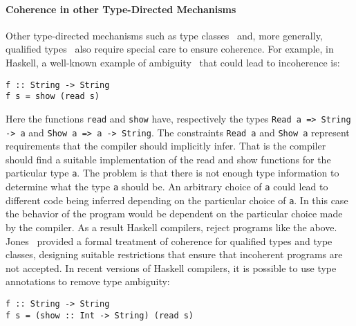 \begin{comment}
As an alternative to syntactic subtyping described in this paper,
Frisch~\textit{et al.}~\cite{frisch2008semantic} studied semantic subtyping. Semantic
subtyping attempts to increase the expressive power of the 

seems to have important advantages over syntactic subtyping. One
worthy avenue for future work is to study languages with intersection types
and merge operator in a semantic subtyping setting.
\end{comment}

\paragraph{Coherence in other Type-Directed Mechanisms} Other
type-directed mechanisms such as type classes~\cite{Wadler89ad-hoc} and, more generally, 
qualified types~\cite{jones94} also require special care to ensure coherence.
For example, in Haskell, a well-known example of ambiguity~\cite{Mark93coherence} 
that could lead to incoherence is:

\begin{verbatim}
f :: String -> String
f s = show (read s)
\end{verbatim}

\noindent Here the functions \verb|read| and \verb|show| have,
respectively the types \verb|Read a => String -> a| and 
\verb|Show a => a -> String|. The constraints \verb|Read a| 
and \verb|Show a| represent requirements that the compiler 
should implicitly infer. That is the compiler should find a suitable 
implementation of the read and show functions for the particular type 
\verb|a|. The problem is that there is not enough type information 
to determine what the type \verb|a| should be. 
An arbitrary choice 
of \verb|a| could lead to different code being inferred depending on
the particular choice of \verb|a|. In this case the behavior of the program 
would be dependent on the particular
choice made by the compiler. As a result Haskell compilers, reject 
programs like the above. Jones~\cite{Mark93coherence} provided a
formal treatment of coherence for qualified types and type classes,
designing suitable restrictions that ensure that incoherent programs 
are not accepted. In recent versions of Haskell compilers, it is possible to use 
type annotations to remove type ambiguity:

\begin{verbatim}
f :: String -> String
f s = (show :: Int -> String) (read s)
\end{verbatim}

